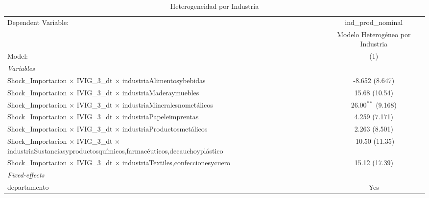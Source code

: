 \documentclass[12pt]{article}
\begin{document}
\setcounter{table}{8}
\begin{table}[htbp]
\centering
\begin{threeparttable}

   \caption{Heterogeneidad por Industria}
   \centering
   \small
   \begin{tabular}{lc}
      \tabularnewline \midrule \midrule
      Dependent Variable:                                                                                                         & ind\_prod\_nominal\\    
                                                                                                                                  & Modelo Heterogéneo por Industria \\   
      Model:                                                                                                                      & (1)\\  
      \midrule
      \emph{Variables}\\
      Shock\_Importacion $\times$ IVIG\_3\_dt $\times$ industriaAlimentosybebidas                                                 & -8.652 (8.647)\\   
      Shock\_Importacion $\times$ IVIG\_3\_dt $\times$ industriaMaderaymuebles                                                    & 15.68 (10.54)\\   
      Shock\_Importacion $\times$ IVIG\_3\_dt $\times$ industriaMineralesnometálicos                                              & 26.00$^{**}$ (9.168)\\   
      Shock\_Importacion $\times$ IVIG\_3\_dt $\times$ industriaPapeleimprentas                                                   & 4.259 (7.171)\\   
      Shock\_Importacion $\times$ IVIG\_3\_dt $\times$ industriaProductosmetálicos                                                & 2.263 (8.501)\\   
      Shock\_Importacion $\times$ IVIG\_3\_dt $\times$ industriaSustanciasyproductosquímicos,farmacéuticos,decauchoyplástico      & -10.50 (11.35)\\   
      Shock\_Importacion $\times$ IVIG\_3\_dt $\times$ industriaTextiles,confeccionesycuero                                       & 15.12 (17.39)\\   
      \midrule
      \emph{Fixed-effects}\\
      departamento                                                                                                                & Yes\\  

\end{tabular}
\end{threeparttable}
\end{table}
\end{document}
